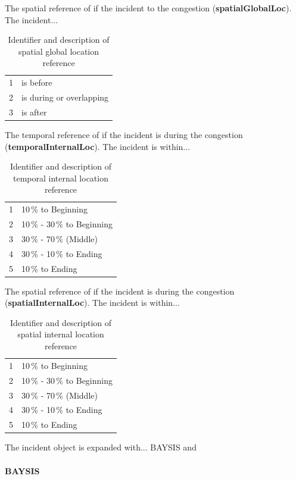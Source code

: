 \documentclass[a4paper,headsepline,footsepline,fontsize=11pt,BCOR=12mm,DIV=12]{report}
\begin{document}
The spatial reference of if the incident to the congestion (\textbf{spatialGlobalLoc}). The incident...
\noindent
\begin{table}[h!]
	\centering
	\begin{tabular}{c|l}  
		1 & is before \\ 
 		2 & is during or overlapping \\ 
 		3 & is after \\ 
	\end{tabular}
	\caption{Identifier and description of spatial global location reference}
\end{table}

The temporal reference of if the incident is during the congestion (\textbf{temporalInternalLoc}). The incident is within...
\noindent
\begin{table}[h!]
	\centering
	\begin{tabular}{c|l}  
		1 & 10\,\% to Beginning \\
 		2 & 10\,\% - 30\,\% to Beginning \\
 		3 & 30\,\% - 70\,\% (Middle) \\
 		4 & 30\,\% - 10\,\% to Ending \\
 		5 & 10\,\% to Ending \\
	\end{tabular}
	\caption{Identifier and description of temporal internal location reference}
\end{table}

The spatial reference of if the incident is during the congestion (\textbf{spatialInternalLoc}). The incident is within...
\noindent
\begin{table}[h!]
	\centering
	\begin{tabular}{c|l}  
		1 & 10\,\% to Beginning \\
 		2 & 10\,\% - 30\,\% to Beginning \\
 		3 & 30\,\% - 70\,\% (Middle) \\
 		4 & 30\,\% - 10\,\% to Ending \\
 		5 & 10\,\% to Ending \\
	\end{tabular}
	\caption{Identifier and description of spatial internal location reference}
\end{table}
    
The incident object is expanded with... BAYSIS and 

\paragraph{BAYSIS}
\end{document}
